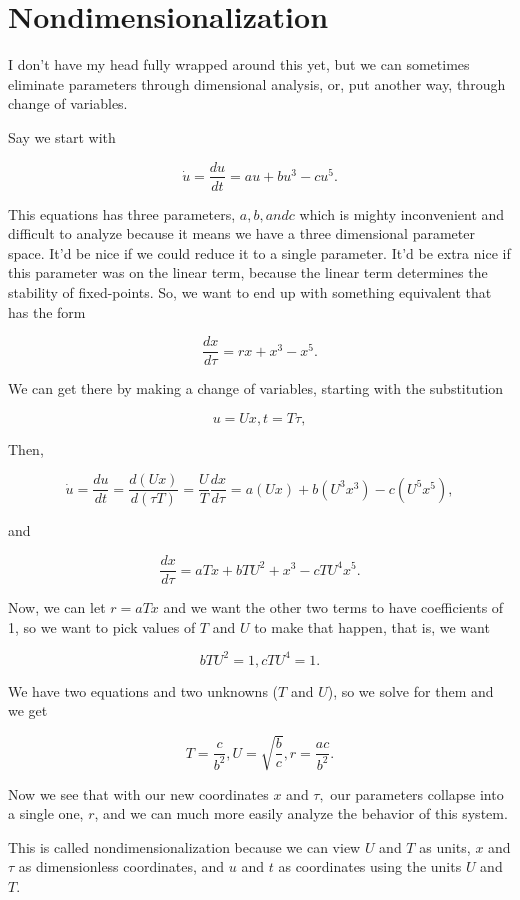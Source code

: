 \documentclass{article}
\begin{document}
\section{Nondimensionalization}

I don't have my head fully wrapped around this yet, but we can sometimes eliminate parameters through dimensional analysis, or, put another way, through change of variables.

Say we start with

\[ \dot{u} = \frac{du}{dt} = au + bu^3 - cu^5. \]

This equations has three parameters, $a, b, and c$ which is mighty inconvenient and difficult to analyze because it means we have a three dimensional parameter space. It'd be nice if we could reduce it to a single parameter. It'd be extra nice if this parameter was on the linear term, because the linear term determines the stability of \@{fixed-points}. So, we want to end up with something equivalent that has the form

\[ \frac{dx}{d \tau} = r x + x^3 - x^5. \]

We can get there by making a change of variables, starting with the substitution

\[ u = Ux, t = T \tau, \]

Then,

\[ \dot{u} = \frac{du}{dt} = \frac{d(Ux)}{d(\tau T)} = \frac{U}{T} \frac{dx}{d \tau} = a(Ux) + b(U^3 x^3) - c(U^5 x^5), \]

and

\[ \frac{dx}{d \tau} = a T x + b T U^2 + x^3 - c T U^4 x^5. \]

Now, we can let $r = a T x$ and we want the other two terms to have coefficients of 1, so we want to pick values of $T$ and $U$ to make that happen, that is, we want

\[ b T U^2 = 1, c T U^4 = 1. \]

We have two equations and two unknowns ($T$ and $U$), so we solve for them and we get

\[ T = \frac{c}{b^2}, U = \sqrt{\frac{b}{c}}, r = \frac{ac}{b^2}. \]

Now we see that with our new coordinates $x$ and $\tau,$ our parameters collapse into a single one, $r$, and we can much more easily analyze the behavior of this system.

This is called nondimensionalization because we can view $U$ and $T$ as units, $x$ and $\tau$ as dimensionless coordinates, and $u$ and $t$ as coordinates using the units $U$ and $T$.
\end{document}
